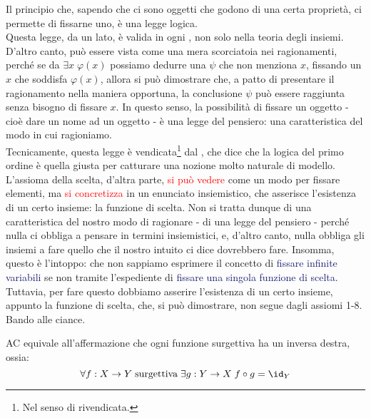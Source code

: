 \documentclass[11pt]{scrartcl}
\begin{document}
Il principio che, sapendo che ci sono oggetti che godono di una certa proprietà, ci permette di fissarne uno, è una legge logica.\\
Questa legge, da un lato, è valida in ogni , non solo nella teoria degli insiemi. D'altro canto, può essere vista come una mera scorciatoia nei ragionamenti, perché se da $\exists x \; \varphi(x)$ possiamo dedurre una $\psi$ che non menziona $x$,
fissando un $x$ che soddisfa $\varphi(x)$, allora si può dimostrare che, a patto di presentare il ragionamento nella maniera opportuna, la conclusione $\psi$ può essere raggiunta senza bisogno di fissare $x$. In questo senso, la possibilità
di fissare un oggetto - cioè dare un nome ad un oggetto - è una legge del pensiero: una caratteristica del modo in cui ragioniamo.\\
Tecnicamente, questa legge è vendicata\footnote{Nel senso di rivendicata.} dal , che dice che la logica del primo ordine è quella giusta per catturare una nozione molto naturale di modello.\\
L'assioma della scelta, d'altra parte, \textcolor{red}{si può vedere} come un modo per fissare elementi, ma \textcolor{red}{si concretizza} in un enunciato insiemistico, che asserisce l'esistenza di un certo insieme: la funzione di scelta.
Non si tratta dunque di una caratteristica del nostro modo di ragionare - di una legge del pensiero - perché nulla ci obbliga a pensare in termini insiemistici, e, d'altro canto, nulla obbliga gli insiemi a fare quello che il nostro intuito ci dice dovrebbero fare.
Insomma, questo è l'intoppo: che non sappiamo esprimere il concetto di \textcolor{MidnightBlue}{fissare infinite variabili} se non tramite l'espediente di \textcolor{MidnightBlue}{fissare una singola funzione di scelta}. Tuttavia, per fare questo dobbiamo asserire l'esistenza di un certo insieme, appunto la funzione di scelta,
che, si può dimostrare, non segue dagli assiomi 1-8.\\
Bando alle ciance.

\begin{note}
	AC equivale all'affermazione che ogni funzione surgettiva ha un inversa destra, ossia:
	\[ \forall f : X \rightarrow Y \; \text{surgettiva}\;\exists g : Y \rightarrow X \; f \circ g = \id_Y
		\]
\end{note}
\end{document}
